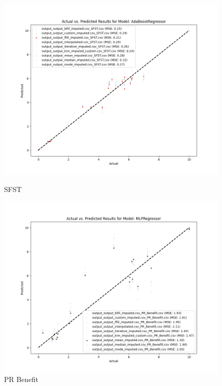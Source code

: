 \begin{figure}[H]
    \centering
    \begin{minipage}{0.495\textwidth}
        \centering
        \includegraphics[width=\linewidth]{reg_section_all/images_reg_training/SFST_AdaBoostRegressor_plot.png}
        \caption{SFST}
        \label{fig:sfst_reg_training}
    \end{minipage}\hfill
    \begin{minipage}{0.495\textwidth}
        \centering
        \includegraphics[width=\linewidth]{reg_section_all/images_reg_training/PR_Benefit_MLPRegressor_plot.png}
        \caption{PR Benefit}
        \label{fig:pr_ben_reg_training}
    \end{minipage}
\end{figure}

